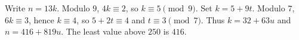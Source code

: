 Write $n=13k$. Modulo $9$, $4k\equiv2$, so $k\equiv5\pmod9$. Set $k=5+9t$. Modulo $7$, $6k\equiv3$, hence $k\equiv4$, so $5+2t\equiv4$ and $t\equiv3\pmod7$. Thus $k=32+63u$ and $n=416+819u$. The least value above $250$ is $\boxed{416}$.
